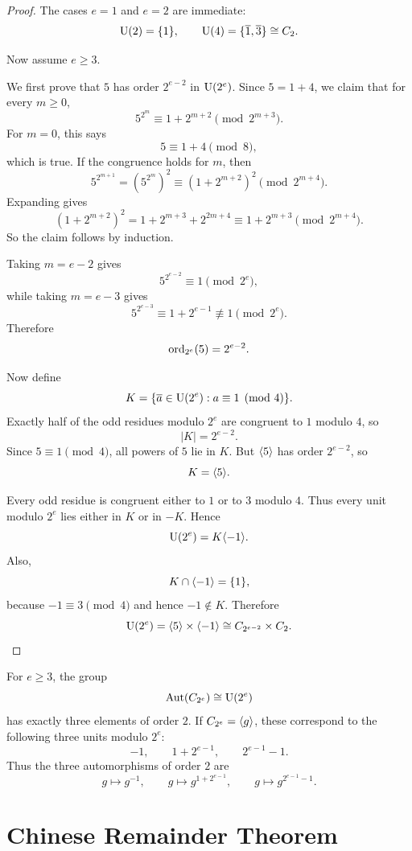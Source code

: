 \begin{proof}
The cases $e=1$ and $e=2$ are immediate:
\[
    \mathrm{U}(2)=\{1\},
    \qquad
    \mathrm{U}(4)=\{\overline{1},\overline{3}\}\cong C_2.
\]

Now assume $e\geq3$.

We first prove that $5$ has order $2^{e-2}$ in $\mathrm{U}(2^e)$. Since $5=1+4$, we claim that for every $m\geq0$,
\[
    5^{2^m}\equiv 1+2^{m+2}\pmod{2^{m+3}}.
\]
For $m=0$, this says
\[
    5\equiv1+4\pmod8,
\]
which is true. If the congruence holds for $m$, then
\[
    5^{2^{m+1}}
    =
    \left(5^{2^m}\right)^2
    \equiv
    (1+2^{m+2})^2
    \pmod{2^{m+4}}.
\]
Expanding gives
\[
    (1+2^{m+2})^2
    =
    1+2^{m+3}+2^{2m+4}
    \equiv
    1+2^{m+3}
    \pmod{2^{m+4}}.
\]
So the claim follows by induction.

Taking $m=e-2$ gives
\[
    5^{2^{e-2}}\equiv1\pmod{2^e},
\]
while taking $m=e-3$ gives
\[
    5^{2^{e-3}}\equiv1+2^{e-1}\not\equiv1\pmod{2^e}.
\]
Therefore
\[
    \operatorname{ord}_{2^e}(5)=2^{e-2}.
\]

Now define
\[
    K=\{\overline{a}\in\mathrm{U}(2^e):a\equiv1\pmod4\}.
\]
Exactly half of the odd residues modulo $2^e$ are congruent to $1$ modulo $4$, so
\[
    |K|=2^{e-2}.
\]
Since $5\equiv1\pmod4$, all powers of $5$ lie in $K$. But $\langle 5\rangle$ has order $2^{e-2}$, so
\[
    K=\langle 5\rangle.
\]

Every odd residue is congruent either to $1$ or to $3$ modulo $4$. Thus every unit modulo $2^e$ lies either in $K$ or in $-K$. Hence
\[
    \mathrm{U}(2^e)=K\langle -1\rangle.
\]
Also,
\[
    K\cap\langle -1\rangle=\{1\},
\]
because $-1\equiv3\pmod4$ and hence $-1\notin K$. Therefore
\[
    \mathrm{U}(2^e)=\langle 5\rangle\times\langle -1\rangle
    \cong C_{2^{e-2}}\times C_2.
\]
\end{proof}

\begin{remark}
For $e\geq3$, the group
\[
    \operatorname{Aut}(C_{2^e})\cong \mathrm{U}(2^e)
\]
has exactly three elements of order $2$. If $C_{2^e}=\langle g\rangle$, these correspond to the following three units modulo $2^e$:
\[
    -1,\qquad
    1+2^{e-1},\qquad
    2^{e-1}-1.
\]
Thus the three automorphisms of order $2$ are
\[
    g\longmapsto g^{-1},
    \qquad
    g\longmapsto g^{1+2^{e-1}},
    \qquad
    g\longmapsto g^{2^{e-1}-1}.
\]
\end{remark}

\section{Chinese Remainder Theorem}

